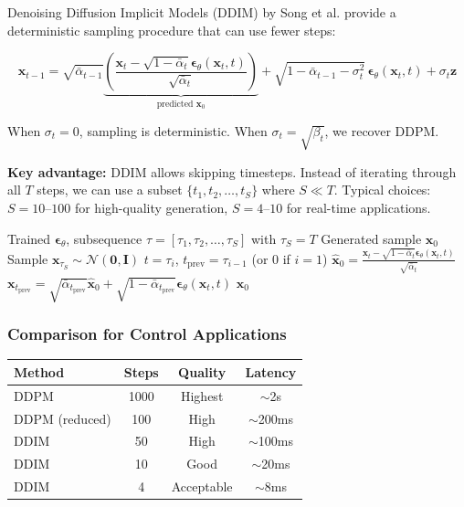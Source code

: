 Denoising Diffusion Implicit Models (DDIM) by Song et al. provide a deterministic sampling procedure that can use fewer steps:

\begin{equation}
\mathbf{x}_{t-1} = \sqrt{\bar{\alpha}_{t-1}}\underbrace{\left(\frac{\mathbf{x}_t - \sqrt{1-\bar{\alpha}_t}\boldsymbol{\epsilon}_\theta(\mathbf{x}_t, t)}{\sqrt{\bar{\alpha}_t}}\right)}_{\text{predicted } \mathbf{x}_0} + \sqrt{1-\bar{\alpha}_{t-1} - \sigma_t^2}\,\boldsymbol{\epsilon}_\theta(\mathbf{x}_t, t) + \sigma_t \mathbf{z}
\label{eq:ddim}
\end{equation}

When $\sigma_t = 0$, sampling is deterministic. When $\sigma_t = \sqrt{\beta_t}$, we recover DDPM.

\textbf{Key advantage:} DDIM allows skipping timesteps. Instead of iterating through all $T$ steps, we can use a subset $\{t_1, t_2, \ldots, t_S\}$ where $S \ll T$. Typical choices: $S = 10$--$100$ for high-quality generation, $S = 4$--$10$ for real-time applications.

\begin{algorithm}[H]
\caption{DDIM Sampling with Reduced Steps}
\label{alg:ddim_sampling}
\begin{algorithmic}[1]
\REQUIRE Trained $\boldsymbol{\epsilon}_\theta$, subsequence $\tau = [\tau_1, \tau_2, \ldots, \tau_S]$ with $\tau_S = T$
\ENSURE Generated sample $\mathbf{x}_0$
\STATE Sample $\mathbf{x}_{\tau_S} \sim \mathcal{N}(\mathbf{0}, \mathbf{I})$
    \STATE $t = \tau_i$, $t_{\text{prev}} = \tau_{i-1}$ (or $0$ if $i=1$)
    \STATE $\hat{\mathbf{x}}_0 = \frac{\mathbf{x}_t - \sqrt{1-\bar{\alpha}_t}\boldsymbol{\epsilon}_\theta(\mathbf{x}_t, t)}{\sqrt{\bar{\alpha}_t}}$
    \STATE $\mathbf{x}_{t_{\text{prev}}} = \sqrt{\bar{\alpha}_{t_{\text{prev}}}}\hat{\mathbf{x}}_0 + \sqrt{1-\bar{\alpha}_{t_{\text{prev}}}}\boldsymbol{\epsilon}_\theta(\mathbf{x}_t, t)$
\ENDFOR
\RETURN $\mathbf{x}_0$
\end{algorithmic}
\end{algorithm}

\subsubsection{Comparison for Control Applications}

\begin{center}
\begin{tabular}{lccc}
\toprule
\textbf{Method} & \textbf{Steps} & \textbf{Quality} & \textbf{Latency} \\
\midrule
DDPM & 1000 & Highest & $\sim$2s \\
DDPM (reduced) & 100 & High & $\sim$200ms \\
DDIM & 50 & High & $\sim$100ms \\
DDIM & 10 & Good & $\sim$20ms \\
DDIM & 4 & Acceptable & $\sim$8ms \\
\bottomrule
\end{tabular}
\end{center}

